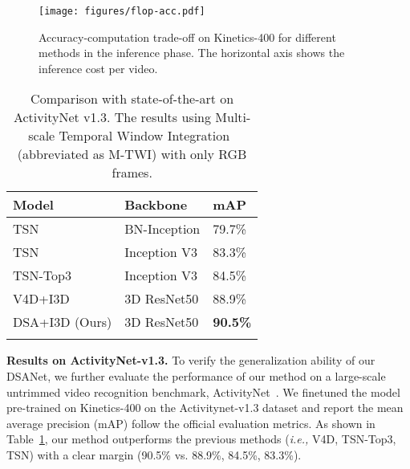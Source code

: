 \documentclass[sigconf]{acmart}
\begin{document}
\begin{figure}[t]
    \centering
    \texttt{[image: figures/flop-acc.pdf]}
    \caption{Accuracy-computation trade-off on Kinetics-400 for different methods in the inference phase. The horizontal axis shows the inference cost per video.}   
    \vspace{-8pt}
    \label{fig:cmp_sota}
\end{figure} 





\begin{table}[th]
\centering
\caption{Comparison with state-of-the-art on ActivityNet v1.3. The results using Multi-scale Temporal Window Integration~\cite{tsn} (abbreviated as M-TWI) with only RGB frames.}

\begin{tabular}{l|l|l}
\shline
{Model}& Backbone & mAP\\
\hline
TSN~\cite{tsn} & BN-Inception & 79.7\% \\
TSN~\cite{tsn}& Inception V3 & 83.3\% \\
TSN-Top3~\cite{tsn}& Inception V3 & 84.5\% \\
V4D+I3D~\cite{zhang2020v4d} & {3D ResNet50} & 88.9\%  \\
\hline
DSA+I3D (Ours) & {3D ResNet50} & \textbf{90.5\%} \\
\shline



\end{tabular}
\label{cmp anet}
\end{table} 

\textbf{Results on ActivityNet-v1.3.}
To verify the generalization ability of our DSANet, we further evaluate the performance of our method on a large-scale untrimmed video recognition benchmark, ActivityNet~\cite{caba2015activitynet}. 
We finetuned the model pre-trained on Kinetics-400 on the Activitynet-v1.3 dataset and report the mean average precision (mAP) follow the official evaluation metrics. 
As shown in Table~\ref{cmp anet}, our method outperforms the previous methods (\emph{i.e.,} V4D, TSN-Top3, TSN) with a clear margin (90.5\% vs. 88.9\%, 84.5\%, 83.3\%).
\end{document}
